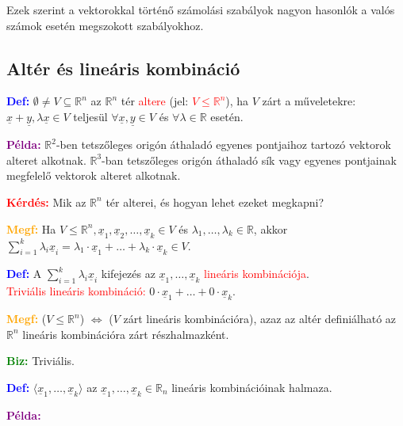 \documentclass[../szamtud.tex]{subfiles}
\begin{document}
        Ezek szerint a vektorokkal történő számolási szabályok nagyon hasonlók a valós számok esetén megszokott szabályokhoz.

    \subsection{Altér és lineáris kombináció}

        \textcolor{blue}{\textbf{Def:}} $\emptyset \neq V \subseteq \mathbb{R}^n$ az $\mathbb{R}^n$ tér \textcolor{red}{altere} (jel: \textcolor{red}{$V \leq \mathbb{R}^n$}), ha $V$ zárt a műveletekre: $\underline{x} + \underline{y}, \lambda \underline{x} \in V$ teljesül $\forall \underline{x},\underline{y} \in V$ és $\forall \lambda \in \mathbb{R}$ esetén. 

        \textcolor{purple}{\textbf{Példa:}} $\mathbb{R}^2$-ben tetszőleges origón áthaladó egyenes pontjaihoz tartozó vektorok alteret alkotnak. $\mathbb{R}^3$-ban tetszőleges origón áthaladó sík vagy egyenes pontjainak megfelelő vektorok alteret alkotnak.

        \textcolor{red}{\textbf{Kérdés:}} Mik az $\mathbb{R}^n$ tér alterei, és hogyan lehet ezeket megkapni?

        \textcolor{orange}{\textbf{Megf:}} Ha $V \leq \mathbb{R}^n, \underline{x}_1, \underline{x}_2, \dots, \underline{x}_k \in V$ és $\lambda_1, \dots, \lambda_k \in \mathbb{R}$, akkor $\sum_{i=1}^{k} \lambda_i \underline{x}_i = \lambda_1\cdot \underline{x}_1 + \dots + \lambda_k \cdot \underline{x}_k \in V$.

        \textcolor{blue}{\textbf{Def:}} A $\sum_{i=1}^{k} \lambda_i\underline{x}_i$ kifejezés az $\underline{x}_1, \dots, \underline{x}_k$ \textcolor{red}{lineáris kombinációja}. \\ \textcolor{red}{Triviális lineáris kombináció:} $0 \cdot \underline{x}_1 + \dots + 0 \cdot \underline{x}_k$.

        \textcolor{orange}{\textbf{Megf:}} ($V \leq \mathbb{R}^n$) $\Longleftrightarrow$ ($V$ zárt lineáris kombinációra), azaz az altér definiálható az $\mathbb{R}^n$ lineáris kombinációra zárt részhalmazként. 

        \textcolor{green}{\textbf{Biz:}} Triviális.

        \textcolor{blue}{\textbf{Def:}} $ \langle \underline{x}_1, \dots, \underline{x}_k \rangle$ az $\underline{x}_1, \dots, \underline{x}_k \in \mathbb{R}_n$ lineáris kombinációinak halmaza.

        \textcolor{purple}{\textbf{Példa:}}
\end{document}
